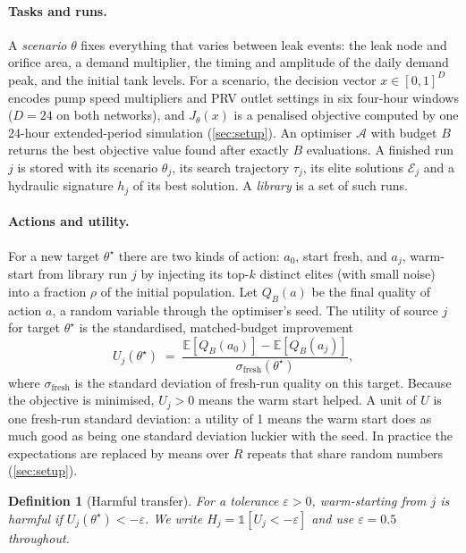 \documentclass[11pt]{article}
\newcommand{\E}{\mathbb{E}}
\newcommand{\harm}{H}
\newcommand{\ufresh}{\sigma_{\mathrm{fresh}}}
\newtheorem{definition}{Definition}
\begin{document}
\paragraph{Tasks and runs.}
A \emph{scenario} $\theta$ fixes everything that varies between leak events: the leak node and orifice area,
a demand multiplier, the timing and amplitude of the daily demand peak, and the initial tank levels. For a scenario,
the decision vector $x\in[0,1]^D$ encodes pump speed multipliers and PRV outlet settings in six four-hour windows
($D=24$ on both networks), and $J_\theta(x)$ is a penalised objective computed by one 24-hour extended-period
simulation (\cref{sec:setup}). An optimiser $\mathcal{A}$ with budget $B$ returns the best objective value found after
exactly $B$ evaluations. A finished run $j$ is stored with its scenario $\theta_j$, its search trajectory $\tau_j$, its
elite solutions $\mathcal{E}_j$ and a hydraulic signature $h_j$ of its best solution. A \emph{library} is a set of such
runs.

\paragraph{Actions and utility.}
For a new target $\theta^\star$ there are two kinds of action: $a_0$, start fresh, and $a_j$, warm-start from library
run $j$ by injecting its top-$k$ distinct elites (with small noise) into a fraction $\rho$ of the initial population.
Let $Q_B(a)$ be the final quality of action $a$, a random variable through the optimiser's seed. The utility of
source $j$ for target $\theta^\star$ is the standardised, matched-budget improvement
\begin{equation}\label{eq:utility}
  U_j(\theta^\star) \;=\; \frac{\E[Q_B(a_0)] - \E[Q_B(a_j)]}{\ufresh(\theta^\star)},
\end{equation}
where $\ufresh$ is the standard deviation of fresh-run quality on this target. Because the objective is minimised,
$U_j>0$ means the warm start helped. A unit of $U$ is one fresh-run standard deviation: a utility of 1 means the warm
start does as much good as being one standard deviation luckier with the seed. In practice the expectations are
replaced by means over $R$ repeats that share random numbers (\cref{sec:setup}).

\begin{definition}[Harmful transfer]
For a tolerance $\varepsilon>0$, warm-starting from $j$ is \emph{harmful} if $U_j(\theta^\star) < -\varepsilon$.
We write $\harm_j=\mathbb{1}[U_j<-\varepsilon]$ and use $\varepsilon=0.5$ throughout.
\end{definition}
\end{document}
